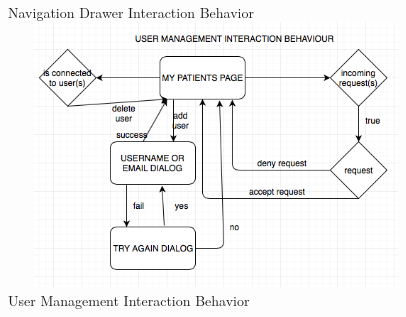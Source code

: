 \begin{center}
\\
Navigation Drawer Interaction Behavior
\\
\includegraphics[width=11cm, height=7cm]{Diagrams/userManagIB.png}
\\
User Management Interaction Behavior
\\
\end{center}

